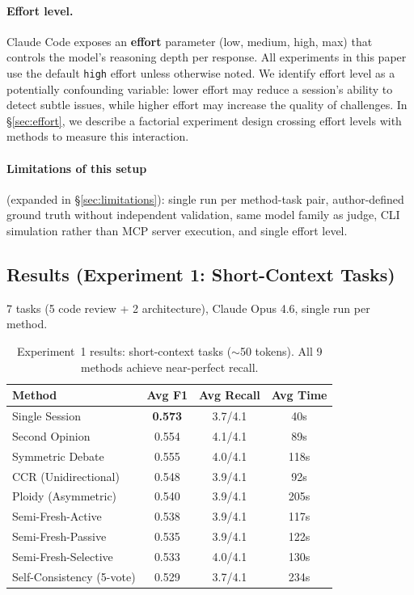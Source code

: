 \documentclass[11pt]{article}
\begin{document}
\paragraph{Effort level.} Claude Code exposes an \textbf{effort} parameter (low, medium, high, max) that controls the model's reasoning depth per response. All experiments in this paper use the default \texttt{high} effort unless otherwise noted. We identify effort level as a potentially confounding variable: lower effort may reduce a session's ability to detect subtle issues, while higher effort may increase the quality of challenges. In \S\ref{sec:effort}, we describe a factorial experiment design crossing effort levels with methods to measure this interaction.

\paragraph{Limitations of this setup} (expanded in \S\ref{sec:limitations}): single run per method-task pair, author-defined ground truth without independent validation, same model family as judge, CLI simulation rather than MCP server execution, and single effort level.

\subsection{Results (Experiment 1: Short-Context Tasks)}
\label{sec:exp1-results}

7 tasks (5 code review + 2 architecture), Claude Opus 4.6, single run per method.

\begin{table}[t]
\centering
\caption{Experiment~1 results: short-context tasks ($\sim$50 tokens). All 9 methods achieve near-perfect recall.}
\label{tab:exp1}
\small
\begin{tabular}{@{}lccc@{}}
\toprule
\textbf{Method} & \textbf{Avg F1} & \textbf{Avg Recall} & \textbf{Avg Time} \\
\midrule
Single Session            & \textbf{0.573} & 3.7/4.1 & 40s  \\
Second Opinion            & 0.554          & 4.1/4.1 & 89s  \\
Symmetric Debate          & 0.555          & 4.0/4.1 & 118s \\
CCR (Unidirectional)      & 0.548          & 3.9/4.1 & 92s  \\
Ploidy (Asymmetric)       & 0.540          & 3.9/4.1 & 205s \\
Semi-Fresh-Active         & 0.538          & 3.9/4.1 & 117s \\
Semi-Fresh-Passive        & 0.535          & 3.9/4.1 & 122s \\
Semi-Fresh-Selective      & 0.533          & 4.0/4.1 & 130s \\
Self-Consistency (5-vote) & 0.529          & 3.7/4.1 & 234s \\
\bottomrule
\end{tabular}
\end{table}
\end{document}
